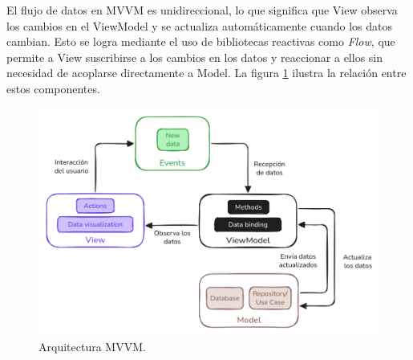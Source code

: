 \pagebreak

El flujo de datos en MVVM es unidireccional, lo que significa que View observa los cambios en el ViewModel y se actualiza automáticamente cuando los datos cambian. Esto se logra mediante el uso de bibliotecas reactivas como \textit{Flow}, que permite a View suscribirse a los cambios en los datos y reaccionar a ellos sin necesidad de acoplarse directamente a Model. La figura \ref{fig:arquitectura_mvvm} ilustra la relación entre estos componentes.

\begin{figure}[ht]
  \caption{Arquitectura MVVM.}
  \label{fig:arquitectura_mvvm}
  \includegraphics[width=\textwidth]{Figuras/arquitectura_mvvm.png}
  \centering
\end{figure}

\pagebreak
